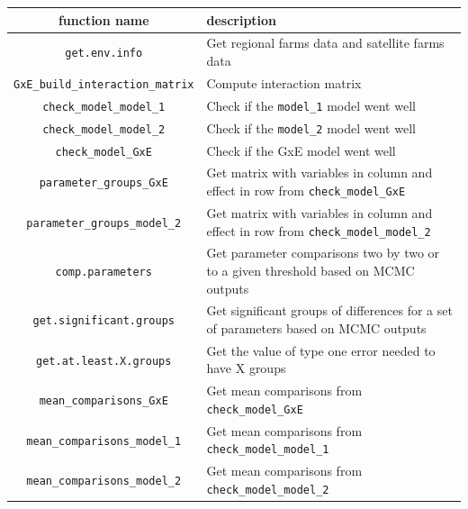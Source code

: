 \documentclass{article}\usepackage[]{graphicx}\usepackage[]{color}
\begin{document}
\begin{table}[H]
\begin{tabular}{cp{}}

\hline
\textbf{function name} & \textbf{description} \\ \hline

\texttt{get.env.info} & Get regional farms data and satellite farms data \\ \hline

\texttt{GxE\_build\_interaction\_matrix} & Compute interaction matrix \\ \hline

\texttt{check\_model\_model\_1} & Check if the \texttt{model\_1} model went well  \\ \hline

\texttt{check\_model\_model\_2} & Check if the \texttt{model\_2} model went well \\ \hline

\texttt{check\_model\_GxE} & Check if the GxE model went well \\ \hline

\texttt{parameter\_groups\_GxE} & Get matrix with variables in column and effect in row from \texttt{check\_model\_GxE} \\ \hline

\texttt{parameter\_groups\_model\_2} & Get matrix with variables in column and effect in row from \texttt{check\_model\_model\_2} \\ \hline

\texttt{comp.parameters} & Get parameter comparisons two by two or to a given threshold based on MCMC outputs \\ \hline

\texttt{get.significant.groups} & Get significant groups of differences for a set of parameters based on MCMC outputs \\ \hline

\texttt{get.at.least.X.groups} & Get the value of type one error needed to have X groups \\ \hline

\texttt{mean\_comparisons\_GxE} & Get mean comparisons from \texttt{check\_model\_GxE} \\ \hline

\texttt{mean\_comparisons\_model\_1} & Get mean comparisons from \texttt{check\_model\_model\_1} \\ \hline

\texttt{mean\_comparisons\_model\_2} &Get mean comparisons from \texttt{check\_model\_model\_2}  \\ \hline


\end{tabular}
\end{table}
\end{document}
